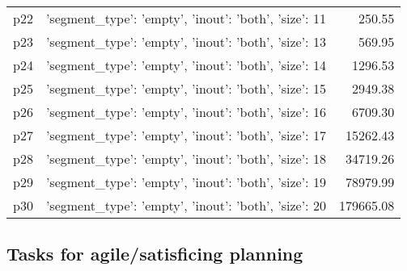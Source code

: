 \documentclass{article}
\begin{document}
\begin{center}
\begin{tabular}{@{}l|r|r@{}}
  p22&{'segment\_type': 'empty', 'inout': 'both', 'size': 11}&250.55\\
  p23&{'segment\_type': 'empty', 'inout': 'both', 'size': 13}&569.95\\
  p24&{'segment\_type': 'empty', 'inout': 'both', 'size': 14}&1296.53\\
  p25&{'segment\_type': 'empty', 'inout': 'both', 'size': 15}&2949.38\\
  p26&{'segment\_type': 'empty', 'inout': 'both', 'size': 16}&6709.30\\
  p27&{'segment\_type': 'empty', 'inout': 'both', 'size': 17}&15262.43\\
  p28&{'segment\_type': 'empty', 'inout': 'both', 'size': 18}&34719.26\\
  p29&{'segment\_type': 'empty', 'inout': 'both', 'size': 19}&78979.99\\
  p30&{'segment\_type': 'empty', 'inout': 'both', 'size': 20}&179665.08
                            \end{tabular}
                            \end{center}
                    

                                \subsection*{Tasks for agile/satisficing planning}
                                
\end{document}
